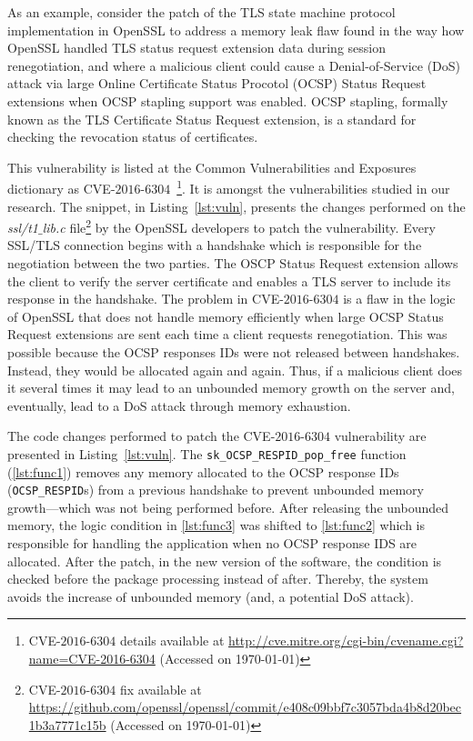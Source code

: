 \documentclass[smallextended]{svjour3}       %
\makeatletter
\newcommand\footnoteref[1]{\protected@xdef\@thefnmark{\ref{#1}}\@footnotemark}
\makeatother
\begin{document}
As an example, consider the patch of the TLS state machine protocol 
implementation in OpenSSL\footnoteref{openssl} to address a memory 
leak flaw found in the way how OpenSSL handled TLS status request 
extension data during session renegotiation, and where a malicious 
client could cause a Denial-of-Service (DoS) attack via large Online 
Certificate Status Procotol (OCSP) Status Request extensions when 
OCSP stapling support was enabled. OCSP stapling, formally known 
as the TLS Certificate Status Request extension, is a standard for 
checking the revocation status of certificates. 

This vulnerability is listed at the Common Vulnerabilities and 
Exposures dictionary as CVE-$2016$-$6304$~\footnote{CVE-$2016$-$6304$
details available at 
\url{http://cve.mitre.org/cgi-bin/cvename.cgi?name=CVE-2016-6304}
(Accessed on \today{})}. It is amongst the vulnerabilities studied 
in our research. The snippet, in Listing~\ref{lst:vuln}, presents 
the changes performed on the
\emph{ssl/t1$\_$lib.c} file\footnote{CVE-$2016$-$6304$ fix available 
 at
\url{https://github.com/openssl/openssl/commit/e408c09bbf7c3057bda4b8d20bec1b3a7771c15b}
(Accessed on \today{})} by the OpenSSL developers to patch the 
vulnerability. Every SSL/TLS connection begins with a handshake 
which is responsible for the negotiation between the two parties. 
The OSCP Status Request extension allows the client to verify the 
server certificate and enables a TLS server to include its response 
in the handshake. The problem in CVE-$2016$-$6304$ is a flaw in the 
logic of OpenSSL that does not handle memory efficiently when large 
OCSP Status Request extensions are sent each time a client requests 
renegotiation. This was possible because the OCSP responses IDs 
were not released between handshakes. Instead, they would be 
allocated again and again. Thus, if a malicious client does it 
several times it may lead to an unbounded memory growth on the 
server and, eventually, lead to a DoS attack through memory 
exhaustion. 

The code changes performed to patch the CVE-$2016$-$6304$ vulnerability are 
presented in Listing~\ref{lst:vuln}. The \texttt{sk\_OCSP\_RESPID\_pop\_free} function 
(\ref{lst:func1}) removes any memory allocated to the OCSP response IDs 
(\texttt{OCSP\_RESPID}s) from a previous handshake to prevent unbounded 
memory growth---which was not being performed before.
After releasing the unbounded memory, the logic condition in 
\ref{lst:func3} was shifted to \ref{lst:func2} which is responsible 
for handling the application when no OCSP response IDS are 
allocated. After the patch, in the new version of the software, the 
condition is checked before the package processing 
instead of after. Thereby, the system avoids the increase of 
unbounded memory (and, a potential DoS attack).
\end{document}
